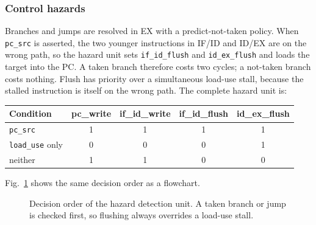\subsubsection{Control hazards}
Branches and jumps are resolved in EX with a predict-not-taken policy. When
\texttt{pc\_src} is asserted, the two younger instructions in IF/ID and ID/EX are on the
wrong path, so the hazard unit sets \texttt{if\_id\_flush} and \texttt{id\_ex\_flush}
and loads the target into the PC. A taken branch therefore costs two cycles; a not-taken
branch costs nothing. Flush has priority over a simultaneous load-use stall, because the
stalled instruction is itself on the wrong path. The complete hazard unit is:
\begin{center}
\footnotesize\setlength{\tabcolsep}{3pt}
\begin{tabular}{@{}lcccc@{}}
\toprule
\textbf{Condition} & \textbf{pc\_write} & \textbf{if\_id\_write} & \textbf{if\_id\_flush} & \textbf{id\_ex\_flush} \\ \midrule
\texttt{pc\_src}          & 1 & 1 & 1 & 1 \\
\texttt{load\_use} only   & 0 & 0 & 0 & 1 \\
neither                   & 1 & 1 & 0 & 0 \\ \bottomrule
\end{tabular}
\end{center}
Fig.~\ref{fig:hazflow} shows the same decision order as a flowchart.
\begin{figure}[!t]
\centering
{}
\caption{Decision order of the hazard detection unit. A taken branch or jump is checked
first, so flushing always overrides a load-use stall.}
\label{fig:hazflow}
\end{figure}

